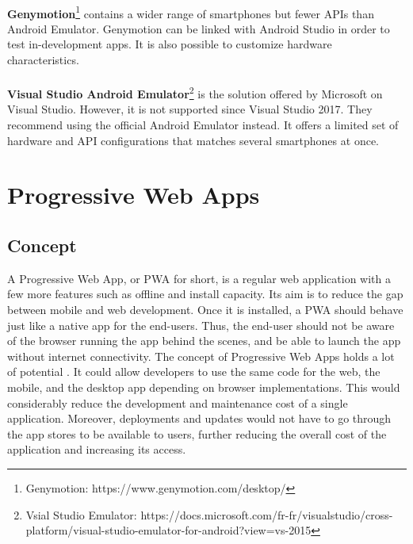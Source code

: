\documentclass{kththesis}
\begin{document}
\paragraph{}
\textbf{Genymotion}\footnote{Genymotion: https://www.genymotion.com/desktop/} contains a wider range of smartphones but fewer APIs than Android Emulator. Genymotion can be linked with Android Studio in order to test in-development apps. It is also possible to customize hardware characteristics.

\paragraph{}
\textbf{Visual Studio Android Emulator}\footnote{Vsial Studio Emulator: https://docs.microsoft.com/fr-fr/visualstudio/cross-platform/visual-studio-emulator-for-android?view=vs-2015} is the solution offered by Microsoft on Visual Studio. However, it is not supported since Visual Studio 2017. They recommend using the official Android Emulator instead. It offers a limited set of hardware and API configurations that matches several smartphones at once. 


\section{Progressive Web Apps}

\subsection{Concept}

A Progressive Web App, or PWA for short, is a regular web application with a few more features such as offline and install capacity. Its aim is to reduce the gap between mobile and web development. Once it is installed, a PWA should behave just like a native app for the end-users. Thus, the end-user should not be aware of the browser running the app behind the scenes, and be able to launch the app without internet connectivity. \newline
The concept of Progressive Web Apps holds a lot of potential \cite{PWApossibleUnifer}. It could allow developers to use the same code for the web, the mobile, and the desktop app depending on browser implementations. This would considerably reduce the development and maintenance cost of a single application. Moreover, deployments and updates would not have to go through the app stores to be available to users, further reducing the overall cost of the application and increasing its access.
\end{document}

